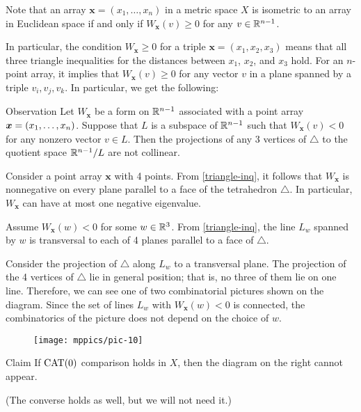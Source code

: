 \documentclass{article}
\begin{document}
Note that an array $\bm{x}=(x_1,\dots,x_n)$ in a metric space $X$ is isometric to an array in Euclidean space if and only if 
$W_{\bm{x}}(v)\ge 0$
for any $v\in \mathbb{R}^{n-1}$.

In particular, the condition $W_{\bm{x}}\ge 0$ for a triple $\bm{x}=(x_1,x_2,x_3)$ means that 
all three triangle inequalities for the distances between $x_1$, $x_2$, and $x_3$ hold.
For an $n$-point array, it implies that $W_{\bm{x}}(v)\ge 0$ for any vector $v$ in a plane spanned by a triple $v_i,v_j,v_k$.
In particular, we get the following:

\begin{thm}{Observation}\label{triangle-inq}
Let $W_{\bm{x}}$ be a form on $\mathbb{R}^{n-1}$ associated with a point array $\bm{x}\z=(x_1,\dots,x_n)$.
Suppose that $L$ is a subspace of $\mathbb{R}^{n-1}$ such that
$W_{\bm{x}}(v)< 0$ for any nonzero vector $v\in L$.
Then the projections of any 3 vertices of $\triangle$ to the quotient space $\mathbb{R}^{n-1}/L$ are not collinear.
\end{thm}

Consider a point array $\bm{x}$ with 4 points.
From \ref{triangle-inq}, 
it follows that $W_{\bm{x}}$ 
is nonnegative on every plane parallel to a face of the tetrahedron $\triangle$.
In particular, $W_{\bm{x}}$ can have at most one negative eigenvalue.

Assume $W_{\bm{x}}(w)<0$ for some $w\in\mathbb{R}^3$.
From \ref{triangle-inq}, the line $L_w$ spanned by
$w$ is transversal to each of 4 planes parallel to a face of $\triangle$.

Consider the projection of $\triangle$ along $L_w$ to a transversal plane. 
The projection of the 4 vertices of $\triangle$ lie in general position; 
that is, no three of them lie on one line.
Therefore, we can see one of two combinatorial pictures shown on the diagram.
Since the set of lines $L_w$ with $W_{\bm{x}}(w)<0$ is connected,
the combinatorics of the picture does not depend on the choice of $w$.

{

\begin{wrapfigure}{r}{33mm}
\vskip-0mm
\centering
\texttt{[image: mppics/pic-10]}
\end{wrapfigure}

\begin{thm}{Claim}
If $\mathrm{CAT}(0)$ comparison holds in $X$, then the diagram on the right cannot appear. 
\end{thm}

(The converse holds as well, but we will not need it.)

}
\end{document}
